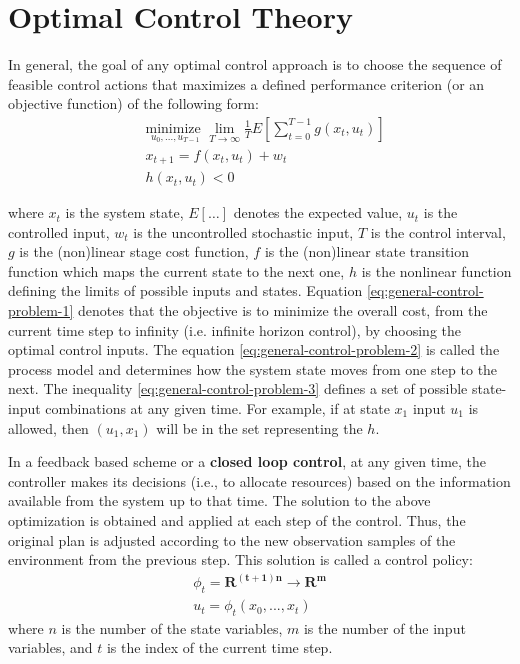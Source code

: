 \section{Optimal Control Theory}  
  In general, the goal of any optimal control approach is to choose the sequence of feasible control actions that maximizes a defined performance criterion (or an objective function) of the following form: 
 \begin{align}
   & \underset{u_0,...,u_{T-1}} {\text{minimize  } }  \lim_{T\to\infty}  \frac{1}{T} E\left[\sum_{t=0}^{T-1} g(x_t,u_t) \right]   \label{eq:general-control-problem-1} \\ 
   & x_{t+1}=f(x_t,u_t)+w_t  \label{eq:general-control-problem-2} \\ 
   & h(x_t,u_t)  < 0 \label{eq:general-control-problem-3} 
  \end{align}
  
  where $x_t$ is the system state,
  $E[\ldots]$ denotes the expected value,  
  $u_t$ is the controlled input, 
  $w_t$ is the uncontrolled stochastic input, 
  $T$ is the control interval, 
  $g$ is the (non)linear stage cost function, 
  $f$ is the (non)linear  state transition function  which maps the current state to the next one,   
  $h$ is the nonlinear function defining the limits of possible inputs and states.      
  Equation \ref{eq:general-control-problem-1}  denotes that the objective is to minimize the overall cost, from the current time step to infinity (i.e. infinite horizon control), by choosing the optimal control inputs. The equation \ref{eq:general-control-problem-2}  is called the process model and determines how the system state moves from one step to the next. 
  The inequality \ref{eq:general-control-problem-3}  defines a set of possible state-input combinations at any given time. For example, if at state $x_1$  input $u_1$  is allowed,  then $(u_1,x_1)$  will be in the set representing the $h$.   
  
In a feedback based scheme or a \textbf{closed loop control}, at any given time, the controller makes its decisions (i.e., to allocate resources) based on the information available from the system up to that time. %
   The solution to the above optimization is obtained and applied at each step of the control. Thus, the original plan is adjusted according to the new observation samples of the environment from the previous step. This solution is called a control policy: 
  \begin{align}
  \phi_t=\mathbf{R^{(t+1)n}}\to \mathbf{R^{m}}   \nonumber \\ 
  u_t=\phi_t(x_0,...,x_t) \nonumber
  \end{align}
  where $n$ is the number of the state variables, $m$ is the number of the input variables, and $t$ is the index of the current time step.

